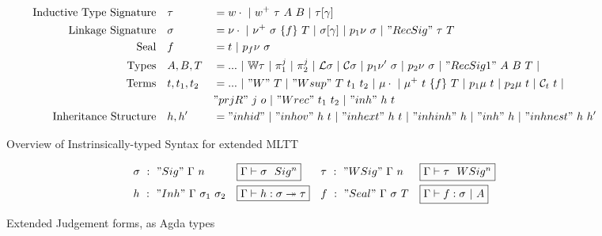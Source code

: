 \begin{figure}[!htb]
  \begin{alignat*}{3}
    \text{Inductive Type Signature}   \quad & \tau       &&= w\cdot~|~w^+~\tau~A~B~|~\tau[\gamma] \\
    \text{Linkage Signature}          \quad & \sigma       &&= \nu\cdot~|~\nu^+~\sigma~\{f\}~T~|~\sigma[\gamma]~|~p_1\nu~\sigma~|~"RecSig"~\tau~T \\
    \text{Seal}          \quad & f       &&= t~|~p_f\nu~\sigma\\    
    \text{Types}   \quad & A, B, T        &&= ...~|~{\mathbb{W}} \tau~|~\pi_1^j~|~\pi_2^j~|~{\mathcal{L}}\sigma~|~{\mathcal{C}}\sigma~|~p_1\nu'~\sigma~|~p_2\nu~\sigma~|~"RecSig1"~A~B~T~|\\
    \text{Terms}   \quad & t, t_1, t_2    &&= ...~|~"W"~T~|~"Wsup"~T~t_1~t_2~|~\mu\cdot~|~\mu^+~t~\{f\}~T~|~p_1\mu~t~|~p_2\mu~t~|~{\mathcal{C}_t}~t~|\\ & &&"prjR"~j~o~|~"Wrec"~t_1~t_2~|~"inh"~h~t\\
    \text{Inheritance Structure} \quad & h, h' &&= "inhid"~|~"inhov"~h~t~|~"inhext"~h~t~|~"inhinh"~h~|~"inh"~h~|~"inhnest"~h~h'
  \end{alignat*}
\caption{Overview of Instrinsically-typed Syntax for extended MLTT}
\end{figure}
\begin{figure}[!htb]
  \begin{align*}
&\sigma~:~"Sig"~\Gamma~n&&\mathboxtext{\goodSig{\Gamma}{\sigma}{n}}  &&\tau~:~"WSig"~\Gamma~n&&\mathboxtext{\goodWSig{\Gamma}{\tau}{n}} \\ &h~:~"Inh"~\Gamma~\sigma_1~\sigma_2&&\mathboxtext{\goodInh{\Gamma}{h}{\sigma}{\tau}} && f~:~"Seal"~\Gamma~\sigma~T&&\mathboxtext{\goodSeal{\Gamma}{f}{\sigma}{A}}
  \end{align*}
\caption{Extended Judgement forms, as Agda types}
\end{figure}
